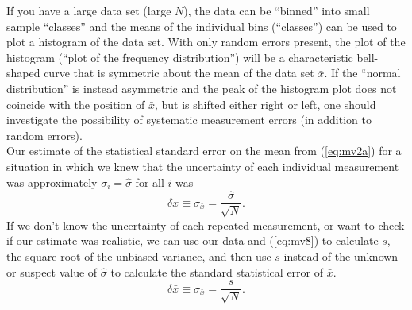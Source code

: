 \documentclass[12pt]{article}
\begin{document}
\noindent If you have a large data set (large $N$), the data can be ``binned'' into small sample ``classes''
  and the means of the individual bins (``classes'') can be used to plot a histogram of the data set.
With only random errors present, the plot of the histogram (``plot of the
  frequency distribution'') will be a characteristic bell-shaped curve that is
  symmetric about the mean of the data set $\bar{x}$.
If the ``normal distribution'' is  instead asymmetric and  the peak of the
  histogram plot does not coincide with the position of $\bar{x}$, but is
  shifted either right or left, one should investigate the possibility of
  systematic measurement errors (in addition to random errors).\\

\noindent   Our estimate of the statistical standard error on the mean from (\ref{eq:mv2a}) for
  a situation in which we knew that the uncertainty of each individual measurement was approximately
  $\sigma_i  =  \hat{\sigma}$ for all $i$ was
\begin{equation} 
  \delta \bar{x} \equiv \sigma_{ \bar{x}} = \frac{\hat{\sigma}}{\sqrt{N}}.
\end{equation}  
If we don't know the uncertainty of each repeated measurement, or want to check
  if our estimate was realistic, we can use our data and (\ref{eq:mv8}) to calculate  $s$,
  the square root of the unbiased variance,  and then use $s$ instead of the unknown
  or suspect value of $\hat{\sigma}$ to calculate the standard statistical  error of $\bar{x}$.
\begin{equation}   \label{eq:mv9}
  \delta \bar{x} \equiv \sigma_{ \bar{x}} = \frac{s}{\sqrt{N}}.
\end{equation}    
\end{document}
